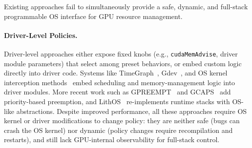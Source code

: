 Existing approaches fail to simultaneously provide a safe, dynamic, and full-stack programmable OS interface for GPU resource management.

\paragraph{Driver-Level Policies.}
Driver-level approaches either expose fixed knobs (e.g., \texttt{cudaMemAdvise}, driver module parameters) that select among preset behaviors, or embed custom logic directly into driver code.
Systems like TimeGraph~\cite{kato2011timegraph}, Gdev~\cite{kato2012gdev}, and OS kernel interception methods~\cite{kernelintercept} embed scheduling and memory-management logic into driver modules.
More recent work such as GPREEMPT~\cite{fan2025gpreempt} and GCAPS~\cite{wang2024gcaps} add priority-based preemption, and LithOS~\cite{coppock2025lithos} re-implements runtime stacks with OS-like abstractions.
Despite improved performance, all these approaches require OS kernel or driver modifications to change policy: they are neither safe (bugs can crash the OS kernel) nor dynamic (policy changes require recompilation and restarts), and still lack GPU-internal observability for full-stack control.

